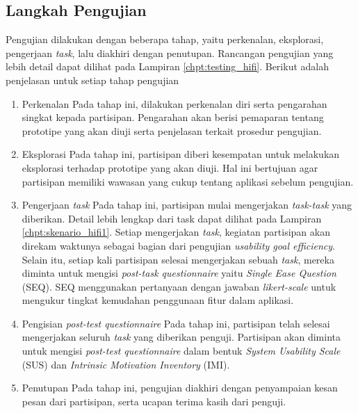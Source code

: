 \subsection{Langkah Pengujian}
\label{subsec:langkah_test_1}

Pengujian dilakukan dengan beberapa tahap, yaitu perkenalan, eksplorasi, pengerjaan \textit{task}, lalu diakhiri dengan penutupan. Rancangan pengujian yang lebih detail dapat dilihat pada Lampiran \ref{chpt:testing_hifi}. Berikut adalah penjelasan untuk setiap tahap pengujian

\begin{enumerate}
  \item Perkenalan
  \subitem Pada tahap ini, dilakukan perkenalan diri serta pengarahan singkat kepada partisipan. Pengarahan akan berisi pemaparan tentang prototipe yang akan diuji serta penjelasan terkait prosedur pengujian. 

  \item Eksplorasi
  \subitem Pada tahap ini, partisipan diberi kesempatan untuk melakukan eksplorasi terhadap prototipe yang akan diuji. Hal ini bertujuan agar partisipan memiliki wawasan yang cukup tentang aplikasi sebelum pengujian.

  \item Pengerjaan \textit{task}
  \subitem Pada tahap ini, partisipan mulai mengerjakan \textit{task-task} yang diberikan. Detail lebih lengkap dari task dapat dilihat pada Lampiran \ref{chpt:skenario_hifi1}. Setiap mengerjakan \textit{task}, kegiatan partisipan akan direkam waktunya sebagai bagian dari pengujian \textit{usability goal efficiency}. Selain itu, setiap kali partisipan selesai mengerjakan sebuah \textit{task}, mereka diminta untuk mengisi \textit{post-task questionnaire} yaitu \textit{Single Ease Question} (SEQ). SEQ menggunakan pertanyaan dengan jawaban \textit{likert-scale} untuk mengukur tingkat kemudahan penggunaan fitur dalam aplikasi.

  \item Pengisian \textit{post-test questionnaire}
  \subitem Pada tahap ini, partisipan telah selesai mengerjakan seluruh \textit{task} yang diberikan penguji. Partisipan akan diminta untuk mengisi \textit{post-test questionnaire} dalam bentuk \textit{System Usability Scale} (SUS) dan \textit{Intrinsic Motivation Inventory} (IMI). 

  \item Penutupan
  \subitem Pada tahap ini, pengujian diakhiri dengan penyampaian kesan pesan dari partisipan, serta ucapan terima kasih dari penguji. 

\end{enumerate}


